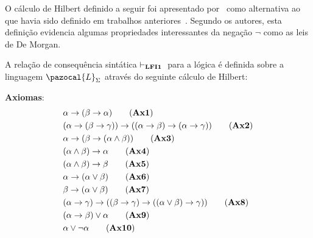     O cálculo de Hilbert definido a seguir foi apresentado por~ como alternativa ao que havia sido definido em trabalhos anteriores~\cite{carnielli2000formal,carnielli2007}. Segundo os autores, esta definição evidencia algumas propriedades interessantes da negação $\neg$ como as leis de De Morgan.


    \begin{definicao}[\lfium{}]
        \label{def:lfi1}
        A relação de consequência sintática $\vdash_{\textbf{LFI1}{}}{}$ para a lógica \lfium{} é definida sobre a linguagem $\pazocal{L}_{\Sigma}$ através do seguinte cálculo de Hilbert:

        \noindent\textbf{Axiomas}:
        \begin{align*}
            & \alpha \to (\beta \to \alpha)\tag{\textbf{Ax1}}                                                                                     \\
            & (\alpha \to (\beta \to \gamma)) \to ((\alpha \to \beta) \to (\alpha \to \gamma ))\tag{\textbf{Ax2}} \\
            & \alpha \to (\beta \to (\alpha \land \beta))\tag{\textbf{Ax3}}                                                                       \\
            & (\alpha \land \beta) \to \alpha\tag{\textbf{Ax4}}                                                                                           \\
            & (\alpha \land \beta) \to \beta\tag{\textbf{Ax5}}                                                                                            \\
            & \alpha \to (\alpha \lor \beta)\tag{\textbf{Ax6}}                                                                                            \\
            & \beta \to (\alpha \lor \beta)\tag{\textbf{Ax7}}                                                                                             \\
            & (\alpha \to \gamma) \to ((\beta \to \gamma) \to ((\alpha \lor \beta) \to \gamma))\tag{\textbf{Ax8}}         \\
            & (\alpha \to \beta) \lor \alpha\tag{\textbf{Ax9}}                                                                                           \\
            & \alpha \lor \neg \alpha\tag{\textbf{Ax10}}                                                                                                          \\

\end{align*}
\end{definicao}
